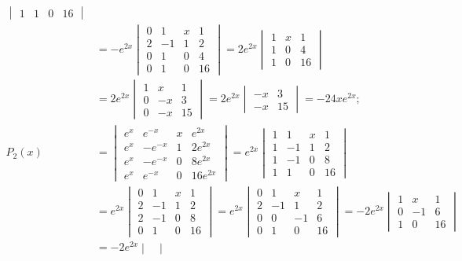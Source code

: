 \documentclass[openany]{book}
\newenvironment{sectionSolutions}{
 \begin{enumerate}[item-label={\thesection.\arabic{enumi}.}]
}{
 \end{enumerate}
}
\begin{document}
\begin{sectionSolutions}
\begin{alist}
\begin{align*}
\begin{vmatrix}
1&1&0&16
\end{vmatrix}\\
&=-e^{2x}\begin{vmatrix}
0&1&x&1\\
2&-1&1&2\\
0&1&0&4\\
0&1&0&16
\end{vmatrix}
=2e^{2x}\begin{vmatrix}
1&x&1\\
1&0&4\\
1&0&16
\end{vmatrix}\\
&=2e^{2x}\begin{vmatrix}
1&x&1\\
0&-x&3\\
0&-x&15
\end{vmatrix}
=2e^{2x}\begin{vmatrix}
-x&3\\
-x&15
\end{vmatrix}=-24xe^{2x};\\
P_2(x)&=
\begin{vmatrix}
e^x&e^{-x}&x&e^{2x}\\
e^x&-e^{-x}&1&2e^{2x}\\
e^x&-e^{-x}&0&8e^{2x}\\
e^x&e^{-x}&0&16e^{2x}
\end{vmatrix}=
e^{2x}\begin{vmatrix}
1&1&x&1\\
1&-1&1&2\\
1&-1&0&8\\
1&1&0&16
\end{vmatrix}\\
&=e^{2x}\begin{vmatrix}
0&1&x&1\\
2&-1&1&2\\
2&-1&0&8\\
0&1&0&16
\end{vmatrix}
=e^{2x}\begin{vmatrix}
0&1&x&1\\
2&-1&1&2\\
0&0&-1&6\\
0&1&0&16
\end{vmatrix}
=-2e^{2x}\begin{vmatrix}
1&x&1\\
0&-1&6\\
1&0&16
\end{vmatrix}\\
&=-2e^{2x}\begin{vmatrix}

\end{vmatrix}
\end{align*}
\end{alist}
\end{sectionSolutions}
\end{document}
